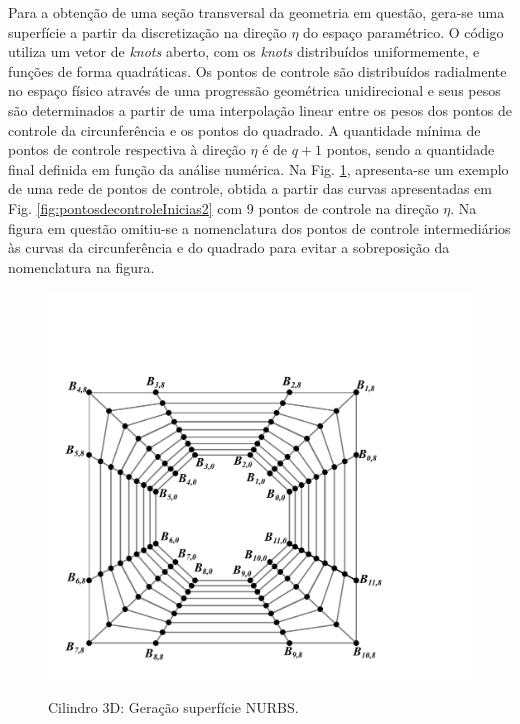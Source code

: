 \documentclass[tese_patricia]{subfiles}
\begin{document}
Para a obtenção de uma seção transversal da geometria em questão, gera-se uma superfície a partir da discretização na direção $\eta$ do espaço paramétrico. O código utiliza um vetor de \textit{knots} aberto, com os 
\textit{knots} distribuídos uniformemente, e funções de forma quadráticas. Os pontos de controle são distribuídos radialmente no espaço físico através de uma progressão geométrica unidirecional e seus pesos são determinados a partir de uma interpolação linear entre os pesos dos pontos de controle da circunferência e os pontos do quadrado. A quantidade mínima de pontos de controle respectiva à direção $\eta$ é de $q+1$ pontos, sendo a quantidade final definida em função da análise numérica. Na Fig. \ref{fig:superficieNURBcilindro}, apresenta-se um exemplo de uma rede de pontos de controle, obtida a partir das curvas apresentadas em Fig. \ref {fig:pontosdecontroleInicias2} com 9 pontos de controle na direção $\eta$. Na figura em questão omitiu-se a nomenclatura dos pontos de controle intermediários às curvas da circunferência e do quadrado para evitar a sobreposição da nomenclatura na figura.


\begin{figure}[htb!]
	\centering 
	\includegraphics[scale=0.4,trim=1cm 1cm 5cm 4cm, clip=true]{Imagens/Cap2/escoamentosobrecilindro3.pdf}	
	\label{fig:superficieNURBcilindro}
	\caption{Cilindro 3D: Geração superfície NURBS.}
\end{figure}
\end{document}

